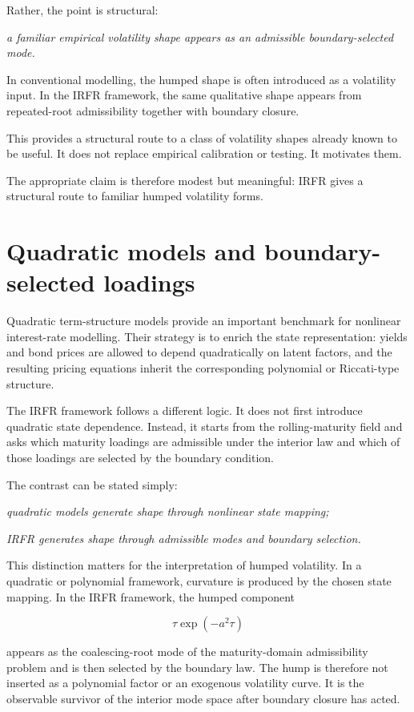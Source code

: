 \documentclass[11pt,oneside]{book}
\begin{document}
Rather, the point is structural:

\emph{a familiar empirical volatility shape appears as an admissible
boundary-selected mode.}

In conventional modelling, the humped shape is often introduced as a
volatility input. In the IRFR framework, the same qualitative shape
appears from repeated-root admissibility together with boundary closure.

This provides a structural route to a class of volatility shapes
already known to be useful. It does not replace empirical calibration or
testing. It motivates them.

The appropriate claim is therefore modest but meaningful: IRFR gives a
structural route to familiar humped volatility forms.

\section{Quadratic models and boundary-selected
loadings}\label{quadratic-models-and-boundary-selected-loadings}

Quadratic term-structure models provide an important benchmark for
nonlinear interest-rate modelling. Their strategy is to enrich the state
representation: yields and bond prices are allowed to depend
quadratically on latent factors, and the resulting pricing equations
inherit the corresponding polynomial or Riccati-type structure.

The IRFR framework follows a different logic. It does not first
introduce quadratic state dependence. Instead, it starts from the
rolling-maturity field and asks which maturity loadings are admissible
under the interior law and which of those loadings are selected by the
boundary condition.

The contrast can be stated simply:

\begin{center}\emph{quadratic models generate shape through nonlinear state mapping;}\end{center}
\emph{IRFR generates shape through admissible modes and boundary
selection.}

This distinction matters for the interpretation of humped volatility. In
a quadratic or polynomial framework, curvature is produced by the chosen
state mapping. In the IRFR framework, the humped component

\[
\tau \exp(-a^2\tau)
\]

appears as the coalescing-root mode of the maturity-domain admissibility
problem and is then selected by the boundary law. The hump is therefore
not inserted as a polynomial factor or an exogenous volatility curve. It
is the observable survivor of the interior mode space after boundary
closure has acted.
\end{document}
